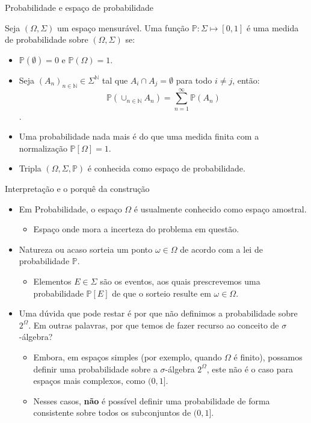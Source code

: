 \documentclass[11pt]{beamer}
\begin{document}
\begin{frame}{Probabilidade e espaço de probabilidade}
\begin{definition}
	Seja $(\Omega, \Sigma)$ um espaço mensurável. Uma função $\mathbb{P}: \Sigma \mapsto [0,1]$ é uma {medida de \color{red} probabilidade} sobre $(\Omega, \Sigma)$ se:
	\begin{itemize}
		\item $\mathbb{P}(\emptyset) = 0$ e {\color{red}$\mathbb{P}(\Omega)=1$}.
		\item Seja $(A_n)_{n \in \mathbb{N} }\in \Sigma^\mathbb{N}$ tal que $A_i \cap A_j = \emptyset$ para todo $i \neq j$, então:
		$$\mathbb{P}\left(\cup_{n \in \mathbb{N}} A_n\right) = \sum_{n=1}^\infty \mathbb{P}(A_n)$$.
	\end{itemize}
\end{definition}
\vspace{1em}
\begin{itemize}
	\item Uma probabilidade nada mais é do que uma medida finita com a normalização $\mathbb{P}[\Omega]=1$.
	\item Tripla $(\Omega, \Sigma, \mathbb{P})$ é conhecida como espaço de probabilidade. 
\end{itemize}
\end{frame}
\begin{frame}{Interpretação e o porquê da construção}
\begin{itemize}
	\item Em Probabilidade, o espaço $\Omega$ é usualmente conhecido como {\color{blue}espaço amostral}.
	\begin{itemize}
		\item Espaço onde mora a incerteza do problema em questão.
	\end{itemize}
	\item Natureza ou acaso sorteia um ponto $\omega \in \Omega$ de acordo com a lei de probabilidade $\mathbb{P}$.
	\begin{itemize}
		\item Elementos $E\in \Sigma$ são os {\color{blue}eventos}, aos quais prescrevemos uma probabilidade $\mathbb{P}[E]$ de que o sorteio resulte em $\omega \in \Omega$.
	\end{itemize}
	\item Uma dúvida que pode restar é por que não definimos a probabilidade sobre $2^\Omega$. Em outras palavras, por que temos de fazer recurso ao conceito de $\sigma$-álgebra?
	\begin{itemize}
		\item Embora, em espaços simples (por exemplo, quando $\Omega$ é finito), possamos definir uma probabilidade sobre a $\sigma$-álgebra $2^\Omega$, este não é o caso para espaços mais complexos, como $(0,1]$.
		\item Nesses casos, \textbf{não} é possível definir uma probabilidade de forma consistente sobre todos os subconjuntos de $(0,1]$.

	\end{itemize}
\end{itemize}
\end{frame}
\end{document}

